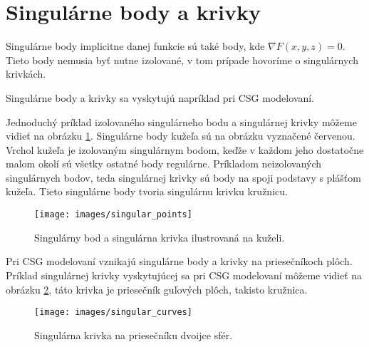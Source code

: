 \section{Singulárne body a krivky}

Singulárne body implicitne danej funkcie sú také body, kde $\nabla F(x, y, z) = 0$. Tieto body nemusia byť nutne izolované, 
v tom prípade hovoríme o singulárnych krivkách. 

Singulárne body a krivky sa vyskytujú napríklad pri CSG modelovaní. 

Jednoduchý príklad izolovaného singulárneho bodu a 
singulárnej krivky môžeme vidieť na obrázku \ref{obr:singular_points}. Singulárne
body kužeľa sú na obrázku vyznačené červenou. Vrchol kužeľa je izolovaným singulárnym bodom, keďže v 
každom jeho dostatočne malom okolí sú všetky ostatné body regulárne. Príkladom neizolovaných singulárnych
bodov, teda singulárnej krivky sú body na spoji podstavy s plášťom kužeľa. Tieto singulárne body tvoria 
singulárnu krivku kružnicu.

\begin{figure}
    \centerline{\texttt{[image: images/singular\_points]}}
    \caption[Singulárny bod a singulárna krivka]
    {Singulárny bod a singulárna krivka ilustrovaná na kuželi.}
    \label{obr:singular_points}
\end{figure}

Pri CSG modelovaní vznikajú singulárne body a krivky na priesečníkoch plôch. Príklad
singulárnej krivky vyskytujúcej sa pri CSG modelovaní môžeme vidieť na obrázku 
\ref{obr:singular_curves}, táto krivka je priesečník guľových plôch, takisto kružnica.

\begin{figure}
    \centerline{\texttt{[image: images/singular\_curves]}}
    \caption[Singulárna krivka na priesečníku dvoijce sfér]
    {Singulárna krivka na priesečníku dvoijce sfér.}
    \label{obr:singular_curves}
\end{figure}